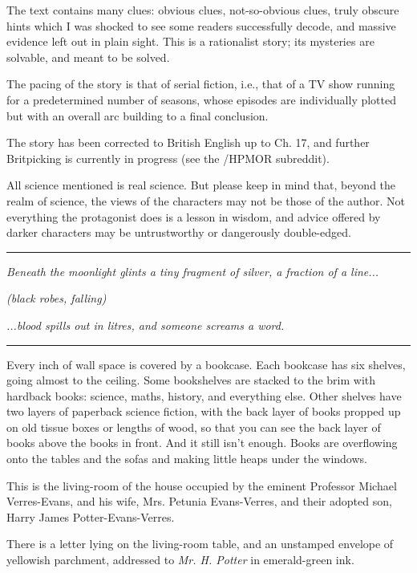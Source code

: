 The text contains many clues: obvious clues, not-so-obvious clues, truly obscure hints which I was shocked to see some readers successfully decode, and massive evidence left out in plain sight. This is a rationalist story; its mysteries are solvable, and meant to be solved.

The pacing of the story is that of serial fiction, i.e., that of a TV show running for a predetermined number of seasons, whose episodes are individually plotted but with an overall arc building to a final conclusion.

The story has been corrected to British English up to Ch. 17, and further Britpicking is currently in progress (see the /HPMOR subreddit).

All science mentioned is real science. But please keep in mind that, beyond the realm of science, the views of the characters may not be those of the author. Not everything the protagonist does is a lesson in wisdom, and advice offered by darker characters may be untrustworthy or dangerously double-edged.

\begin{center}\rule{3in}{0.4pt}\end{center}

\emph{Beneath the moonlight glints a tiny fragment of silver, a fraction of a line...}

\emph{(black robes, falling)}

\emph{...blood spills out in litres, and someone screams a word.}

\begin{center}\rule{3in}{0.4pt}\end{center}

Every inch of wall space is covered by a bookcase. Each bookcase has six shelves, going almost to the ceiling. Some bookshelves are stacked to the brim with hardback books: science, maths, history, and everything else. Other shelves have two layers of paperback science fiction, with the back layer of books propped up on old tissue boxes or lengths of wood, so that you can see the back layer of books above the books in front. And it still isn't enough. Books are overflowing onto the tables and the sofas and making little heaps under the windows.

This is the living-room of the house occupied by the eminent Professor Michael Verres-Evans, and his wife, Mrs. Petunia Evans-Verres, and their adopted son, Harry James Potter-Evans-Verres.

There is a letter lying on the living-room table, and an unstamped envelope of yellowish parchment, addressed to \emph{Mr. H. Potter} in emerald-green ink.

